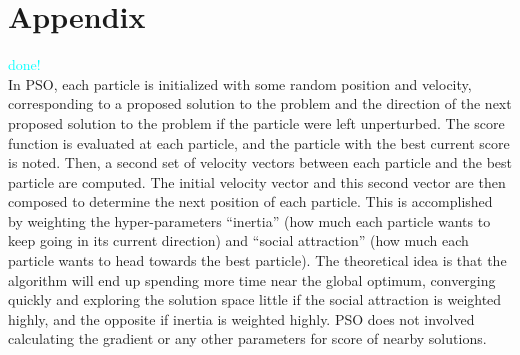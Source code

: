 \documentclass{article}
\begin{document}
\section{Appendix}
\textcolor{cyan}{done!} \\
In PSO, each particle is initialized with some random position and velocity, corresponding to a proposed solution to the problem and the direction of the next proposed solution to the problem if the particle were left unperturbed. The score function is evaluated at each particle, and the particle with the best current score is noted. Then, a second set of velocity vectors between each particle and the best particle are computed. The initial velocity vector and this second vector are then composed to determine the next position of each particle. This is accomplished by weighting the hyper-parameters ``inertia'' (how much each particle wants to keep going in its current direction) and ``social attraction'' (how much each particle wants to head towards the best particle). The theoretical idea is that the algorithm will end up spending more time near the global optimum, converging quickly and exploring the solution space little if the social attraction is weighted highly, and the opposite if inertia is weighted highly. PSO does not involved calculating the gradient or any other parameters for score of nearby solutions.
  
\end{document}
